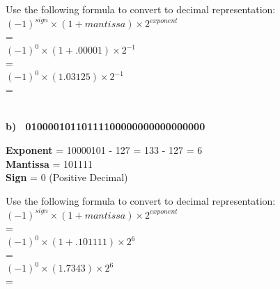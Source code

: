 \documentclass[12pt]{article}
\begin{document}
	
	\begin{center}
		
		Use the following formula to convert to decimal representation:  \vspace{0.5cm} \\
		
		$(-1)^{sign} \times (1 + mantissa) \times 2^{exponent} $ \\
		
		=  \\
		
		$(-1)^{0} \times (1 + .00001) \times 2^{-1} $  \\
		
		=  \\
		
		
		$(-1)^{0} \times (1.03125) \times 2^{-1} $  \\
		
		=  \\
		
		 \vspace{1cm}  \\
		
	\end{center}
	
	
	
	
	
	
	
	\textbf{b) \ 01000010110111100000000000000000} \vspace{0.5cm}
	
	\noindent \textbf{Exponent} = 10000101 - 127 = 133 - 127 = 6 \\
	\textbf{Mantissa} = 101111  \\
	\textbf{Sign} = 0 (Positive Decimal)  \vspace{0.1cm} \\
	
	
	\begin{center}
		
		Use the following formula to convert to decimal representation:  \vspace{0.5cm} \\
		
		$(-1)^{sign} \times (1 + mantissa) \times 2^{exponent} $ \\
		
		=  \\
		
		$(-1)^{0} \times (1 + .101111) \times 2^{6} $  \\
		
		=  \\
		
		
		$(-1)^{0} \times (1.7343) \times 2^{6} $  \\
		
		=  \\
		
		 \vspace{0.7cm}  \\
		
	\end{center}
	
\end{document}
